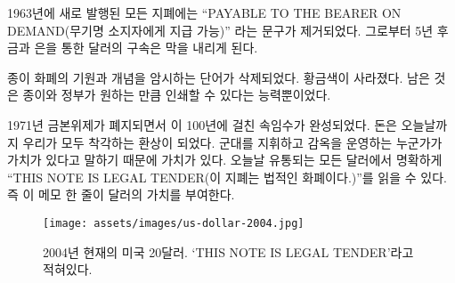 \begin{comment}
In 1963, the words \enquote{PAYABLE TO THE BEARER ON DEMAND} were removed from
all newly issued notes. Five years later, the redemption of paper notes
for gold and silver ended.
\end{comment}
1963년에 새로 발행된 모든 지폐에는 
\enquote{PAYABLE TO THE BEARER ON DEMAND(무기명 소지자에게 지급 가능)} 라는 문구가 제거되었다. 
그로부터 5년 후 금과 은을 통한 달러의 구속은 막을 내리게 된다.

\begin{comment}
The words hinting on the origins and the idea behind paper money were
removed. The golden color disappeared. All that was left was the paper
and with it the ability of the government to print as much of it as it
wishes.
\end{comment}
종이 화폐의 기원과 개념을 암시하는 단어가 삭제되었다. 
황금색이 사라졌다. 
남은 것은 종이와 정부가 원하는 만큼 인쇄할 수 있다는 능력뿐이었다.

\begin{comment}
With the abolishment of the gold standard in 1971, this century-long
sleight-of-hand was complete. Money became the illusion we all share to
this day: fiat money. It is worth something because someone commanding
an army and operating jails says it is wort능h something. As can be
clearly read on every dollar note in circulation today, \enquote{THIS NOTE IS
LEGAL TENDER}. In other words: It is valuable because the note says so.
\end{comment}
1971년 금본위제가 폐지되면서 이 100년에 걸친 속임수가 완성되었다. 
돈은 오늘날까지 우리가 모두 착각하는 환상이 되었다. 
군대를 지휘하고 감옥을 운영하는 누군가가 가치가 있다고 말하기 때문에 가치가 있다. 
오늘날 유통되는 모든 달러에서 명확하게 \enquote{THIS NOTE IS
LEGAL TENDER(이 지폐는 법적인 화폐이다.)}를 읽을 수 있다.
즉 이 메모 한 줄이 달러의 가치를 부여한다.

\begin{comment}
\begin{figure}
  \centering
  \texttt{[image: assets/images/us-dollar-2004.jpg]}
  \caption{A 2004 series U.S. twenty dollar note used today. `THIS NOTE IS LEGAL TENDER'}
  \label{fig:us-dollar-2004}
\end{figure}
\end{comment}
\begin{figure}
  \centering
  \texttt{[image: assets/images/us-dollar-2004.jpg]}
  \caption{2004년 현재의 미국 20달러. `THIS NOTE IS LEGAL TENDER'라고 적혀있다.}
  \label{fig:us-dollar-2004}
\end{figure}

